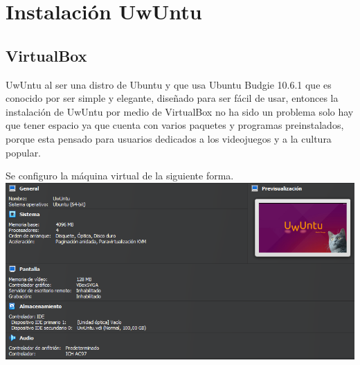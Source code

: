 \documentclass{article}
\begin{document}
\newpage

\section{Instalación UwUntu}

   \subsection{VirtualBox}
    UwUntu al ser una distro de Ubuntu y que usa Ubuntu Budgie 10.6.1 que es conocido por ser simple y elegante, diseñado para ser fácil de usar, entonces la instalación de UwUntu por medio de VirtualBox no ha sido un problema solo hay que tener espacio ya que cuenta con varios paquetes y programas preinstalados, porque esta pensado para usuarios dedicados a los videojuegos y a la cultura popular.

    Se configuro la máquina virtual de la siguiente forma.
        \\ 
    \includegraphics[scale=0.7]{Uwuntu/VirtualDescripcion.png}
\newpage
\end{document}
